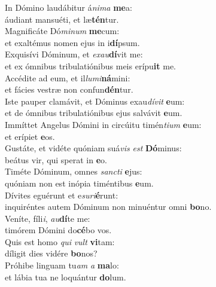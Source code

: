 \evenverse In Dómino laudábitur á\textit{ni}\textit{ma} \textbf{me}a:~\*\\
\evenverse áudiant mansuéti, et læ\textbf{tén}tur.\\
\oddverse Magnificáte Dó\textit{mi}\textit{num} \textbf{me}cum:~\*\\
\oddverse et exaltémus nomen ejus in i\textbf{dí}psum.\\
\evenverse Exquisívi Dóminum, et \textit{e}\textit{xau}\textbf{dí}vit me:~\*\\
\evenverse et ex ómnibus tribulatiónibus meis erípu\textbf{it} me.\\
\oddverse Accédite ad eum, et il\textit{lu}\textit{mi}\textbf{ná}mini:~\*\\
\oddverse et fácies vestræ non confun\textbf{dén}tur.\\
\evenverse Iste pauper clamávit, et Dóminus exau\textit{dí}\textit{vit} \textbf{e}um:~\*\\
\evenverse et de ómnibus tribulatiónibus ejus salvávit \textbf{e}um.\\
\oddverse Immíttet Angelus Dómini in circúitu timén\textit{ti}\textit{um} \textbf{e}um:~\*\\
\oddverse et erípiet \textbf{e}os.\\
\evenverse Gustáte, et vidéte quóniam suá\textit{vis} \textit{est} \textbf{Dó}minus:~\*\\
\evenverse beátus vir, qui sperat in \textbf{e}o.\\
\oddverse Timéte Dóminum, omnes \textit{san}\textit{cti} \textbf{e}jus:~\*\\
\oddverse quóniam non est inópia timéntibus \textbf{e}um.\\
\evenverse Dívites eguérunt et e\textit{su}\textit{ri}\textbf{é}runt:~\*\\
\evenverse inquiréntes autem Dóminum non minuéntur omni \textbf{bo}no.\\
\oddverse Veníte, fíli\textit{i}, \textit{au}\textbf{dí}te me:~\*\\
\oddverse timórem Dómini do\textbf{cé}bo vos.\\
\evenverse Quis est homo \textit{qui} \textit{vult} \textbf{vi}tam:~\*\\
\evenverse díligit dies vidére \textbf{bo}nos?\\
\oddverse Próhibe linguam tu\textit{am} \textit{a} \textbf{ma}lo:~\*\\
\oddverse et lábia tua ne loquántur \textbf{do}lum.\\

